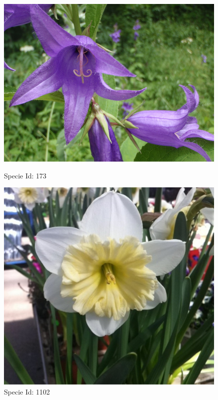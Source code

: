 \documentclass[xcolor=table]{beamer}
\begin{document}
\begin{frame}
\begin{figure}[htbp]
\begin{minipage}[c]{.45\linewidth}
\begin{center}
\includegraphics[scale=0.40]{63.jpg}
\caption{Specie Id: 173}
\label{fig:image4}
\end{center}
\end{minipage}
\hfill
\begin{minipage}[c]{.45\linewidth}
\begin{center}
\includegraphics[scale=0.08]{2391.jpg}
\caption{Specie Id: 1102 }
\label{fig:image5}
\end{center}
\end{minipage}
\end{figure}



\end{frame}
\end{document}

